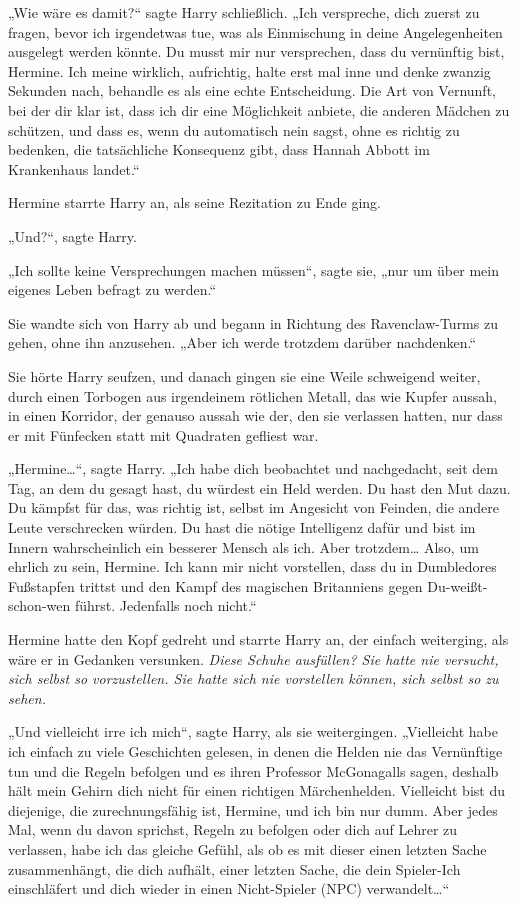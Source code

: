 {„Wie wäre es damit?“ sagte Harry schließlich. „Ich verspreche, dich zuerst zu fragen, bevor ich irgendetwas tue, was als Einmischung in deine Angelegenheiten ausgelegt werden könnte. Du musst mir nur versprechen, dass du vernünftig bist, Hermine. Ich meine wirklich, aufrichtig, halte erst mal inne und denke zwanzig Sekunden nach, behandle es als eine echte Entscheidung. Die Art von Vernunft, bei der dir klar ist, dass ich dir eine Möglichkeit anbiete, die anderen Mädchen zu schützen, und dass es, wenn du automatisch nein sagst, ohne es richtig zu bedenken, die tatsächliche Konsequenz gibt, dass Hannah Abbott im Krankenhaus landet.“

Hermine starrte Harry an, als seine Rezitation zu Ende ging.

„Und?“, sagte Harry.

„Ich sollte keine Versprechungen machen müssen“, sagte sie, „nur um über mein eigenes Leben befragt zu werden.“

Sie wandte sich von Harry ab und begann in Richtung des Ravenclaw-Turms zu gehen, ohne ihn anzusehen. „Aber ich werde trotzdem darüber nachdenken.“

Sie hörte Harry seufzen, und danach gingen sie eine Weile schweigend weiter, durch einen Torbogen aus irgendeinem rötlichen Metall, das wie Kupfer aussah, in einen Korridor, der genauso aussah wie der, den sie verlassen hatten, nur dass er mit Fünfecken statt mit Quadraten gefliest war.

„Hermine…“, sagte Harry. „Ich habe dich beobachtet und nachgedacht, seit dem Tag, an dem du gesagt hast, du würdest ein Held werden. Du hast den Mut dazu. Du kämpfst für das, was richtig ist, selbst im Angesicht von Feinden, die andere Leute verschrecken würden. Du hast die nötige Intelligenz dafür und bist im Innern wahrscheinlich ein besserer Mensch als ich. Aber trotzdem… Also, um ehrlich zu sein, Hermine. Ich kann mir nicht vorstellen, dass du in Dumbledores Fußstapfen trittst und den Kampf des magischen Britanniens gegen Du-weißt-schon-wen führst. Jedenfalls noch nicht.“

Hermine hatte den Kopf gedreht und starrte Harry an, der einfach weiterging, als wäre er in Gedanken versunken. \emph{Diese Schuhe ausfüllen? Sie hatte nie versucht, sich selbst so vorzustellen. Sie hatte sich nie vorstellen können, sich selbst so zu sehen.}

„Und vielleicht irre ich mich“, sagte Harry, als sie weitergingen. „Vielleicht habe ich einfach zu viele Geschichten gelesen, in denen die Helden nie das Vernünftige tun und die Regeln befolgen und es ihren Professor McGonagalls sagen, deshalb hält mein Gehirn dich nicht für einen richtigen Märchenhelden. Vielleicht bist du diejenige, die zurechnungsfähig ist, Hermine, und ich bin nur dumm. Aber jedes Mal, wenn du davon sprichst, Regeln zu befolgen oder dich auf Lehrer zu verlassen, habe ich das gleiche Gefühl, als ob es mit dieser einen letzten Sache zusammenhängt, die dich aufhält, einer letzten Sache, die dein Spieler-Ich einschläfert und dich wieder in einen Nicht-Spieler (NPC) verwandelt…“

}
